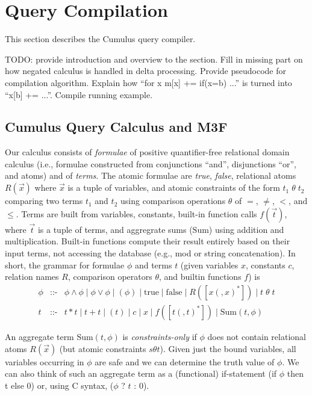 \section{Query Compilation}


This section describes the Cumulus query compiler.

TODO: provide introduction and overview to the section. Fill in missing part
on how negated calculus is handled in delta processing. Provide
pseudocode for compilation algorithm. Explain how ``for x m[x] += if(x=b) ...''
is turned into ``x[b] += ...''. Compile running example.


\subsection{Cumulus Query Calculus and M3F}


\def\safe{\mbox{safe}}
\def\AggSum{\mbox{Sum}}

Our calculus consists of
{\em formulae} of positive quantifier-free relational domain calculus
(i.e., formulae constructed from conjunctions ``and'',
disjunctions ``or'', and atoms) and of {\em terms}.
%
The atomic formulae are {\em true}, {\em false}, relational atoms $R(\vec{x})$
where $\vec{x}$ is a tuple of variables,
and atomic constraints of the form $t_1 \;\theta\; t_2$ comparing two terms
$t_1$ and $t_2$ using comparison operations $\theta$ of $=$, $\neq$, $<$,
and $\leq$.
%
Terms are built from variables, constants, built-in function calls
$f(\vec{t})$, where $\vec{t}$ is a tuple of terms,
and aggregrate sums ($\AggSum$) using addition and multiplication.
Built-in functions compute their result entirely based on their input
terms, not accessing the database (e.g., mod or string concatenation).
In short, the grammar for formulae $\phi$ and terms $t$
(given variables $x$, constants $c$, relation names $R$,
comparison operators $\theta$,
and builtin functions $f$) is
\begin{eqnarray*}
  \phi &\mbox{::-}& \phi \land \phi
               \mid \phi \lor \phi \mid (\phi)
               \mid \mbox{true} \mid \mbox{false} \mid R([x(,x)^*])
               \mid t \;\theta\; t
\\
  t &\mbox{::-}& t * t \mid t + t \mid (t) \mid c \mid x \mid f([t(,t)^*]) \mid
                 \AggSum(t, \phi)
\end{eqnarray*}

An aggregate term $\AggSum(t, \phi)$
is {\em constraints-only} if $\phi$ does not
contain relational atoms $R(\vec{x})$ (but atomic constraints $s \theta t$).
Given just the bound variables, all variables
occurring in $\phi$ are safe and we can determine the truth value of
$\phi$. We can also think of such an aggregate term as a (functional)
if-statement (if $\phi$ then t else 0)
or, using C syntax, ($\phi$ ? $t$ : 0).

